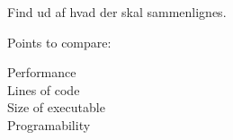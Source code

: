 
Find ud af hvad der skal sammenlignes.

Points to compare:
\begin{description}
\item[Performance]
\item[Lines of code]
\item[Size of executable]
\item[Programability]
\end{description}
